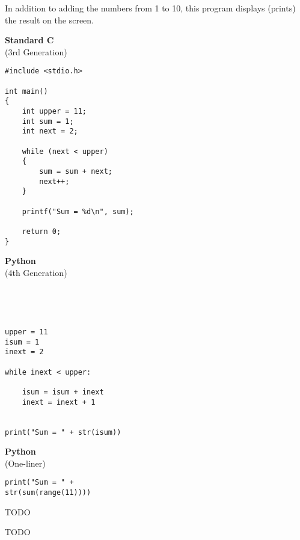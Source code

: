 
In addition to adding the numbers from 1 to 10, this program displays (prints) the result on the screen.

\begin{center}
\begin{minipage}[t]{186pt}

\textbf{Standard C} \\
(3rd Generation)

\begin{verbatim}
#include <stdio.h>

int main()
{
    int upper = 11;
    int sum = 1;
    int next = 2;

    while (next < upper)
    {
        sum = sum + next;
        next++;
    }

    printf("Sum = %d\n", sum);

    return 0;
}
\end{verbatim}
\end{minipage}
\hfill
\begin{minipage}[t]{156pt}

\textbf{Python} \\
(4th Generation)

\begin{verbatim}




upper = 11
isum = 1
inext = 2

while inext < upper:

    isum = isum + inext
    inext = inext + 1


print("Sum = " + str(isum))
\end{verbatim}
\end{minipage}
\hfill
\begin{minipage}[t]{124pt}

\textbf{Python} \\
(One-liner)

\begin{verbatim}
print("Sum = " +
str(sum(range(11))))
\end{verbatim}
\end{minipage}
\end{center}




\Q TODO

\begin{answer}
TODO
\end{answer}
